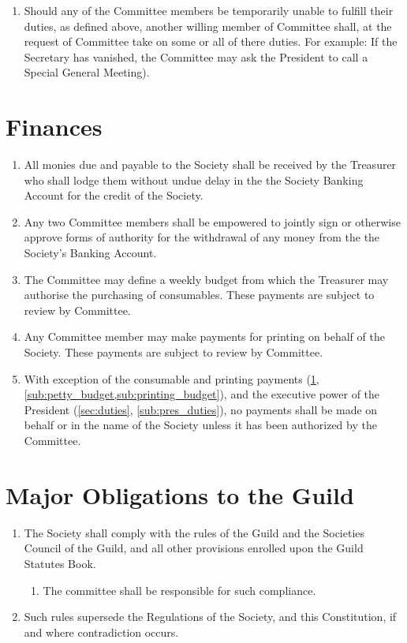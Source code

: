 \documentclass[a4paper]{article}
\begin{document}
\begin{enumerate}
    \item Should any of the Committee members be temporarily unable to fulfill their duties, as defined above, another willing member of Committee shall, at the request of Committee take on some or all of there duties. For example: If the Secretary has vanished, the Committee may ask the President to call a Special General Meeting).
\end{enumerate}


\section{Finances} \label{sec:finances}
\begin{enumerate}
	\item All monies due and payable to the Society shall be received by the Treasurer who shall lodge them without undue delay in the the Society Banking Account for the credit of the Society.
    \item Any two Committee members shall be empowered to jointly sign or otherwise approve forms of authority for the withdrawal of any money from the the Society's Banking Account.
    \item \label{sub:petty_budget} The Committee may define a weekly budget from which the Treasurer may authorise the purchasing of consumables. These payments are subject to review by Committee.
    \item \label{sub:printing_budget} Any Committee member may make payments for printing on behalf of the Society. These payments are subject to review by Committee.
    \item With exception of the consumable and printing payments (\cref{sec:finances}, \cref{sub:petty_budget,sub:printing_budget}), and the executive power of the President (\cref{sec:duties}, \cref{sub:pres_duties}), no payments shall be made on behalf or in the name of the Society unless it has been authorized by the Committee.
\end{enumerate}

\section{Major Obligations to the Guild} \label{sec:guild_obligations}
\begin{enumerate}
    \item The Society shall comply with the rules of the Guild and the Societies Council of the Guild, and all other provisions enrolled upon the Guild Statutes Book.
    \begin{enumerate}
        \item The committee shall be responsible for such compliance.
    \end{enumerate}
    \item Such rules supersede the Regulations of the Society, and this Constitution, if and where contradiction occurs.
\end{enumerate}
\end{document}
